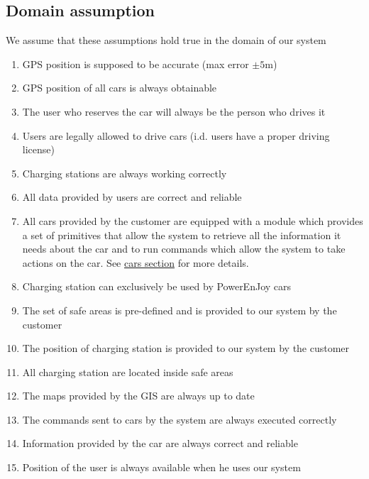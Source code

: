 \subsection{Domain assumption}
	We assume that these assumptions hold true in the domain of our system 
	\begin{enumerate}[label=\textbf{DA\arabic*}]
		\item GPS position is supposed to be accurate (max error $\pm5$m)
		\item GPS position of all cars is always obtainable
		\item The user who reserves the car will always be the person who drives it
		\item Users are legally allowed to drive cars (i.d. users have a proper driving license)
		\item Charging stations are always working correctly
		\item All data provided by users are correct and reliable
		\item All cars provided by the customer are equipped with a module which provides a set of
		primitives that allow the system to retrieve all the information it needs about
		the car and to run commands which allow the system to take actions on the car. See \hyperref[sec:cars]{cars section} for more details.
		\item Charging station can exclusively be used by PowerEnJoy cars
		\item The set of safe areas is pre-defined and is provided to our system by the customer
		\item The position of charging station is provided to our system by the customer
		\item All charging station are located inside safe areas
		\item The maps provided by the GIS are always up to date
		\item The commands sent to cars by the system are always executed
		correctly
		\item Information provided by the car are always correct and reliable
		\item Position of the user is always available when he uses our system
		
	\end{enumerate}